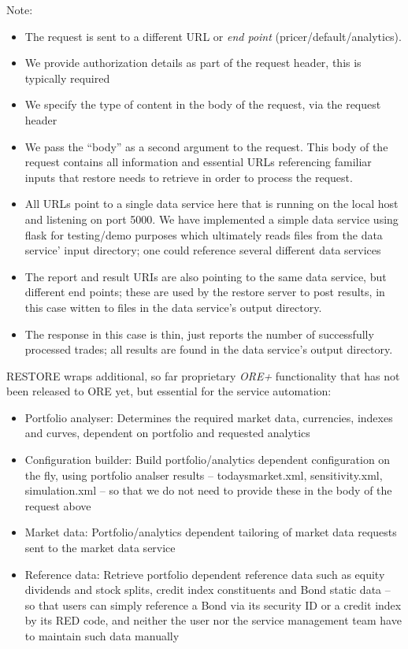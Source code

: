 \documentclass[12pt, a4paper]{report}
\begin{document}
Note:
\begin{itemize}
\item The request is sent to a different URL or {\em end point} (pricer/default/analytics).
\item We provide authorization details as part of the request header, this is typically required
\item We specify the type of content in the body of the request, via the request header 
\item We pass the ``body'' as a second argument to the request. This body of the request contains
  all information and essential URLs referencing familiar inputs that restore needs to retrieve in order to
  process the request. 
\item All URLs point to a single data service here that is running on the local host and listening on port
  5000. We have implemented a simple data service using flask for testing/demo purposes which ultimately
  reads files from the data service' input directory; one could reference several different data services
\item The report and result URIs are also pointing to the same data service, but different end points;
  these are used by the restore server to post results, in this case witten to files in the data
  service's output directory.
\item The response in this case is thin, just reports the number of successfully processed trades;
  all results are found in the data service's output directory.
\end{itemize}

RESTORE wraps additional, so far proprietary {\em ORE+} functionality that has not been
released to ORE yet, but essential for the service automation:
\begin{itemize}
\item Portfolio analyser: Determines the required market data, currencies, indexes and curves, dependent
  on portfolio and requested analytics
\item Configuration builder: Build portfolio/analytics dependent configuration on the fly, using portfolio
  analser results -- todaysmarket.xml, sensitivity.xml, simulation.xml -- so that we do not need to
  provide these in the body of the request above
\item Market data: Portfolio/analytics dependent tailoring of market data requests sent to the market data
  service
\item Reference data: Retrieve portfolio dependent reference data such as equity dividends and stock splits,
  credit index constituents and Bond static data -- so that users can simply reference a Bond via its
  security ID or a credit index by its RED code, and neither the user nor the service management team have
  to maintain such data manually
\end{itemize}
\end{document}

